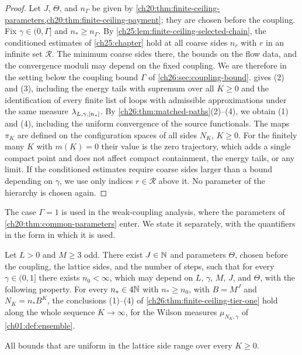 \begin{proof}
Let $J$, $\Theta$, and $n_\Gamma$ be given by \cref{ch20:thm:finite-ceiling-parameters,ch20:thm:finite-ceiling-payment}; they are chosen before the coupling. Fix $\gamma\in(0,\Gamma]$ and $n_*\ge n_\Gamma$. By \cref{ch25:lem:finite-ceiling-selected-chain}, the conditioned estimates of \cref{ch25:chapter} hold at all coarse sides $n_r$ with $r$ in an infinite set $\mathcal R$. The minimum coarse sides there, the bounds on the flow data, and the convergence moduli may depend on the fixed coupling. We are therefore in the setting below the coupling bound $\Gamma$ of \cref{ch26:sec:coupling-bound}.  gives (2) and (3), including the energy tails with supremum over all $K\ge0$ and the identification of every finite list of loops with admissible approximations under the same measure $\lambda_{L,\gamma,[n_*]}$. By \cref{ch26:thm:matched-paths}(2)--(4), we obtain (1) and (4), including the uniform convergence of the source functionals. The maps $\pi_K$ are defined on the configuration spaces of all sides $N_K$, $K\ge0$. For the finitely many $K$ with $m(K)=0$ their value is the zero trajectory, which adds a single compact point and does not affect compact containment, the energy tails, or any limit. If the conditioned estimates require coarse sides larger than a bound depending on $\gamma$, we use only indices $r\in\mathcal R$ above it. No parameter of the hierarchy is chosen again.
\end{proof}

The case $\Gamma=1$ is used in the weak-coupling analysis, where the parameters of \cref{ch20:thm:common-parameters} enter. We state it separately, with the quantifiers in the form in which it is used.

\begin{theorem}\label{ch26:thm:tier-one}
Let $L>0$ and $M\ge3$ odd. There exist $J\in\mathbb N$ and parameters $\Theta$, chosen before the coupling, the lattice sides, and the number of steps, such that for every $\gamma\in(0,1]$ there exists $n_0<\infty$, which may depend on $L$, $\gamma$, $M$, $J$, and $\Theta$, with the following property. For every $n_*\in4\mathbb N$ with $n_*\ge n_0$, with $B=M^J$ and $N_K=n_*B^K$, the conclusions (1)--(4) of \cref{ch26:thm:finite-ceiling-tier-one} hold along the whole sequence $K\to\infty$, for the Wilson measures $\mu_{N_K,\gamma}$ of \cref{ch01:def:ensemble}.
\end{theorem}

All bounds that are uniform in the lattice side range over every $K\ge0$.

